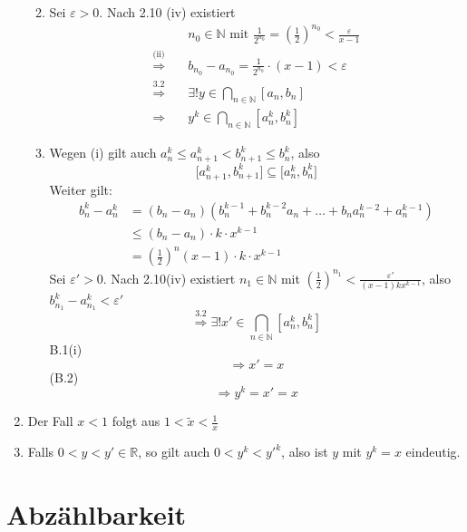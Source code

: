 \begin{enumerate}
\begin{enumerate}[ \bfseries{} B.1]
\begin{enumerate}[(i)]
		\end{enumerate}
		\item Sei $\varepsilon > 0$. Nach 2.10 (iv) existiert
		\begin{align*}
			&n_0 \in \mathds{N} \text{ mit } \frac{1}{2^{n_0}} = \left(\frac{1}{2}\right)^{n_0} < \frac{\varepsilon}{x-1} \\
			\overset{\text{(ii)}}{\Longrightarrow} \quad 
			&b_{n_0} - a_{n_0} = \frac{1}{2^{n_0}} \cdot (x-1) < \varepsilon \\
			\overset{\text{3.2}}{\Longrightarrow} \quad 
			&\exists ! y \in \underset{n \in \mathds{N}}{\bigcap} [a_n , b_n] \\
			\Longrightarrow \quad &y^k \in \underset{n \in \mathds{N} }{\bigcap} [a_n^k , b_n^k]
		\end{align*}
		\item Wegen (i) gilt auch $a_n^k \leq a_{n+1}^k < b_{n+1}^k \leq b_n^k$, also 
		\[
			\Big[ a_{n+1}^k , b_{n+1}^k \Big] \subseteq \Big[ a_n^k , b_n^k \Big]
		\]
		Weiter gilt:
		\begin{align*}
			b_n^k -a_n^k &= (b_n - a_n) (b_n^{k-1} + b_n^{k-2} a_n + \ldots  + b_n a_n^{k-2} +a_n^{k-1}) \\
			&\leq (b_n - a_n) \cdot k \cdot x^{k-1} \\
			&= (\frac{1}{2})^n (x-1) \cdot k \cdot x^{k-1}
		\end{align*}
		Sei $\varepsilon' > 0$. Nach 2.10(iv) existiert $n_1 \in \mathds{N}$ mit 
		$(\frac{1}{2})^{n_1} < \frac{\varepsilon'}{(x-1)k x^{k-1}}$, also $b_{n_1}^k - a_{n_1}^k < \varepsilon'$
		\[
			\overset{\text{3.2}}{\Longrightarrow} 
			\exists ! x' \in \underset{n \in \mathds{N}}{\bigcap} [a_n^k , b_n^k]
		\]
		B.1(i)
		\[
			\Longrightarrow x' = x
		\]
		(B.2) 
		\[
			\Longrightarrow y^k = x' = x
		\]
	\end{enumerate}
	\item Der Fall $x<1$ folgt aus $1< \tilde x < \frac{1}{x}$
	\item Falls $0 < y < y' \in \mathds{R}$, so gilt auch $0 < y^k < y'^k$, also ist $y$ mit $y^k = x$ eindeutig.
\end{enumerate}

\section{Abzählbarkeit} %
\label{sec:abzählbarkeit}

